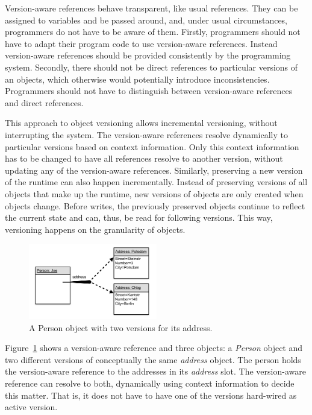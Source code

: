 Version-aware references behave transparent, like usual references.
They can be assigned to variables and be passed around, and, under usual circumstances, programmers do not have to be aware of them.
Firstly, programmers should not have to adapt their program code to use version-aware references.
Instead version-aware references should be provided consistently by the programming system.
Secondly, there should not be direct references to particular versions of an objects, which otherwise would potentially introduce inconsistencies.
Programmers should not have to distinguish between version-aware references and direct references.

This approach to object versioning allows incremental versioning, without interrupting the system.
The version-aware references resolve dynamically to particular versions based on context information.
Only this context information has to be changed to have all references resolve to another version, without updating any of the version-aware references.
Similarly, preserving a new version of the runtime can also happen incrementally.
Instead of preserving versions of all objects that make up the runtime, new versions of objects are only created when objects change.
Before writes, the previously preserved objects continue to reflect the current state and can, thus, be read for following versions.
This way, versioning happens on the granularity of objects.

\begin{figure}[h]
    \centering
    \includegraphics[width=0.5\textwidth]{figures/versionAwareReference.png}
    \caption{A Person object with two versions for its address.}
    \label{fig:VersionAwareReference}
\end{figure}

Figure~\ref{fig:VersionAwareReference} shows a version-aware reference and three objects:
a \emph{Person} object and two different versions of conceptually the same \emph{address} object.
The person holds the version-aware reference to the addresses in its \emph{address} slot.
The version-aware reference can resolve to both, dynamically using context information to decide this matter.
That is, it does not have to have one of the versions hard-wired as active version.

